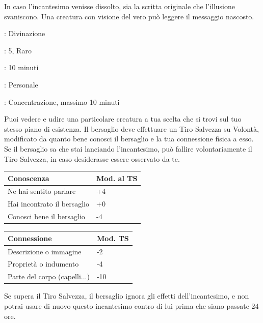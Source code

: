 \begin{multicols}{2}
In caso l'incantesimo venisse dissolto, sia la scritta originale che l'illusione svaniscono. Una creatura con visione del vero può leggere il messaggio nascosto.

\noindent\colorbox{OBSSgold!10}{
\begin{minipage}{0.95\linewidth}
\begin{description}[noitemsep, topsep=0pt, parsep=0pt, partopsep=0pt, leftmargin=0cm, labelwidth=1.3cm]
	\item[\textbf{Lista}]: Divinazione
	\item[\textbf{Livello}]: 5, Raro
	\item[\textbf{Lancio}]: 10 minuti
	\item[\textbf{Gittata}]: Personale
	\item[\textbf{Durata}]: Concentrazione, massimo 10 minuti
\end{description}
\end{minipage}}\smallskip

Puoi vedere e udire una particolare creatura a tua scelta che si trovi sul tuo stesso piano di esistenza. Il bersaglio deve effettuare un Tiro Salvezza su Volontà, modificato da quanto bene conosci il bersaglio e la tua connessione fisica a esso. Se il bersaglio sa che stai lanciando l'incantesimo, può fallire volontariamente il Tiro Salvezza, in caso desiderasse essere osservato da
te.

\medskip

\noindent\begin{tabularx}{\linewidth}{Xl}
	\toprule
 \rowcolor{gray!20}\textbf{Conoscenza} & \textbf{Mod. al TS}\\
	\toprule
	Ne hai sentito parlare &+4\\
 \rowcolor{gray!20}Hai incontrato il bersaglio &+0\\
	Conosci bene il bersaglio &-4
\end{tabularx}

\noindent\begin{tabularx}{\linewidth}{Xl}
	\toprule
 \rowcolor{gray!20}\textbf{Connessione} & \textbf{Mod. TS}\\
	\toprule
	Descrizione o immagine &-2\\
 \rowcolor{gray!20}Proprietà o indumento & -4\\
	Parte del corpo (capelli...)&-10
\end{tabularx}

\medskip

Se supera il Tiro Salvezza, il bersaglio ignora gli effetti dell'incantesimo, e non potrai usare di nuovo questo incantesimo contro di lui prima che siano passate 24 ore.


\end{multicols}
